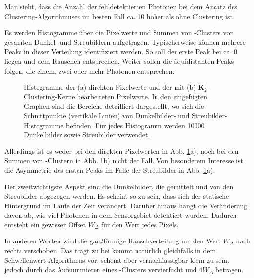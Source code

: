 \noindent
Man sieht, dass die Anzahl der fehldetektierten Photonen bei dem Ansatz des Clustering-Al\-go\-rith\-muses im besten Fall ca. 10 höher als ohne Clustering ist. 

\noindent
Es werden Histogramme über die Pixelwerte und Summen von -Clusters von gesamten Dunkel- und Streubildern aufgetragen. Typischerweise können mehrere Peaks in dieser Verteilung identifiziert werden. So soll der erste Peak bei ca. \SI{0}{\adu} liegen und dem Rauschen entsprechen. Weiter sollen die äquidistanten Peaks folgen, die einem, zwei oder mehr Photonen entsprechen.
\begin{figure}[H]
    \centering
    
    \caption{Histogramme der (a) direkten Pixelwerte und der mit (b) $\mathbf{K}_2$-Clustering-Kerne bearbeiteten Pixelwerte. In den eingefügten Graphen sind die Bereiche detailliert dargestellt, wo sich die Schnittpunkte (vertikale Linien) von Dunkelbilder- und Streubilder-Histogramme befinden. Für jedes Histogramm werden \num{10000} Dunkelbilder sowie Streubilder verwendet.}
    \label{fig:no_pr_cl_2_histograms}
\end{figure}
\noindent
Allerdings ist es weder bei den direkten Pixelwerten in Abb. \ref{fig:no_pr_cl_2_histograms}a), noch bei den Summen von -Clustern in Abb. \ref{fig:no_pr_cl_2_histograms}b) nicht der Fall. Von besonderem Interesse ist die Asymmetrie des ersten Peaks im Falle der Streubilder in Abb. \ref{fig:no_pr_cl_2_histograms}a).

\noindent
Der zweitwichtigste Aspekt sind die Dunkelbilder, die gemittelt und von den Streubilder abgezogen werden. Es scheint so zu sein, dass sich der statische Hintergrund im Laufe der Zeit verändert. Darüber hinaus hängt die Veränderung davon ab, wie viel Photonen in dem Sensorgebiet detektiert wurden. Dadurch entsteht ein gewisser Offset $W_\Delta$ für den Wert jedes Pixels.

\noindent
In anderen Worten wird die gaußförmige Rauschverteilung um den Wert $W_\Delta$ nach rechts verschoben. Das trägt zu bei kommt natürlich gleichfalls in dem Schwellenwert-Algorithmus vor, scheint aber vernachlässigbar klein zu sein.  jedoch durch das Aufsummieren eines -Clusters vervierfacht und $4W_\Delta$ betragen.

